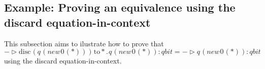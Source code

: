 \subsection{Example: Proving an equivalence using the discard equation-in-context}

This subsection aims to ilustrate how to prove that
\begin{equation}
  - \triangleright \text{disc} \hspace{1pt} (q \hspace{1pt} (\textit{new}\hspace{1pt}0 \hspace{1pt}(*))) \hspace{1pt} \text{to} *. \hspace{1pt} q \hspace{1pt} (\textit{new}\hspace{1pt}0 \hspace{1pt}(*)): \textit{qbit} = - \triangleright q \hspace{1pt} (\textit{new}\hspace{1pt}0 \hspace{1pt}(*)): \textit{qbit} 
\end{equation}
using the discard equation-in-context.

